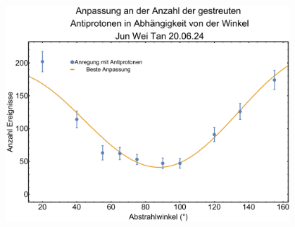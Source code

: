 \documentclass[prb,12pt]{revtex4-2}
\theoremstyle{definition}
\theoremstyle{definition}
\begin{document}
\begin{center}
	\includegraphics[width=0.8\textwidth]{plt1.pdf}
\end{center}
\end{document}
